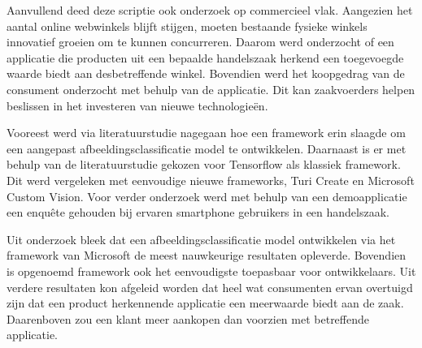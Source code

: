 Aanvullend deed deze scriptie ook onderzoek op commercieel vlak. Aangezien het aantal online webwinkels blijft stijgen, moeten bestaande fysieke winkels innovatief groeien om te kunnen concurreren. Daarom werd onderzocht of een applicatie die producten uit een bepaalde handelszaak herkend een toegevoegde waarde biedt aan desbetreffende winkel. Bovendien werd het koopgedrag van de consument onderzocht met behulp van de applicatie. Dit kan zaakvoerders helpen beslissen in het investeren van nieuwe technologieën. 

Vooreest werd via literatuurstudie nagegaan hoe een framework erin slaagde om een aangepast afbeeldingsclassificatie model te ontwikkelen. Daarnaast is er met behulp van de literatuurstudie gekozen voor Tensorflow als klassiek framework. Dit werd vergeleken met eenvoudige nieuwe frameworks, Turi Create en Microsoft Custom Vision. Voor verder onderzoek werd met behulp van een demoapplicatie een enquête gehouden bij ervaren smartphone gebruikers in een handelszaak. 

Uit onderzoek bleek dat een afbeeldingsclassificatie model ontwikkelen via het framework van Microsoft de meest nauwkeurige resultaten opleverde. Bovendien is opgenoemd framework ook het eenvoudigste toepasbaar voor ontwikkelaars. Uit verdere resultaten kon afgeleid worden dat heel wat consumenten ervan overtuigd zijn dat een product herkennende applicatie een meerwaarde biedt aan de zaak. Daarenboven zou een klant meer aankopen dan voorzien met betreffende applicatie. 

